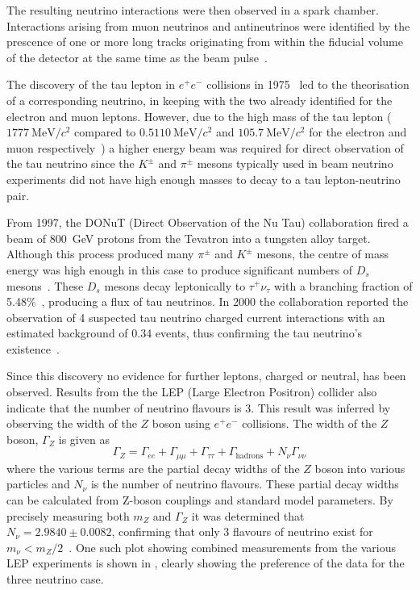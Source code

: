The resulting neutrino interactions were then observed in a spark chamber.
Interactions arising from muon neutrinos and antineutrinos were identified by the prescence of one or more long tracks originating from within the fiducial volume of the detector at the same time as the beam pulse~\cite{numuDiscovery}.   


The discovery of the tau lepton in $e^{+}e^{-}$ collisions in 1975~\cite{tauLepton} led to the theorisation of a corresponding neutrino, in keeping with the two already identified for the electron and muon leptons.
However, due to the high mass of the tau lepton ($1777~\text{MeV}/c^{2}$ compared to $0.5110~\text{MeV}/c^{2}$ and $105.7~\text{MeV}/c^{2}$ for the electron and muon respectively~\cite{pdg2018}) a higher energy beam was required for direct observation of the tau neutrino since the $K^{\pm}$ and $\pi^{\pm}$ mesons typically used in beam neutrino experiments did not have high enough masses to decay to a tau lepton-neutrino pair.

From 1997, the DONuT (Direct Observation of the Nu Tau) collaboration fired a beam of 800~GeV protons from the Tevatron into a tungsten alloy target.
Although this process produced many $\pi^{\pm}$ and $K^{\pm}$ mesons, the centre of mass energy was high enough in this case to produce significant numbers of $D_{s}$ mesons~\cite{donutFinal}.
These $D_{s}$ mesons decay leptonically to $\tau^{+}\nu_{\tau}$ with a branching fraction of 5.48\%~\cite{dsFraction}, producing a flux of tau neutrinos.
In 2000 the collaboration reported the observation of 4 suspected tau neutrino charged current interactions with an estimated background of 0.34 events, thus confirming the tau neutrino's existence~\cite{tauNeutrino}.  

Since this discovery no evidence for further leptons, charged or neutral, has been observed.
Results from the the LEP (Large Electron Positron) collider also indicate that the number of neutrino flavours is 3.
This result was inferred by observing the width of the $Z$ boson using $e^{+}e^{-}$ collisions.
The width of the $Z$ boson, $\Gamma_{Z}$ is given as
\begin{equation}
  \Gamma_{Z} = \Gamma_{ee} + \Gamma_{\mu\mu} + \Gamma_{\tau\tau} + \Gamma_{\text{hadrons}} + N_{\nu}\Gamma_{\nu\nu}
\end{equation}
where the various terms are the partial decay widths of the $Z$ boson into various particles and $N_{\nu}$ is the number of neutrino flavours.
These partial decay widths can be calculated from Z-boson couplings and standard model parameters.
By precisely measuring both $m_{Z}$ and $\Gamma_{Z}$ it was determined that $N_{\nu} = 2.9840 \pm 0.0082$, confirming that only 3 flavours of neutrino exist for $m_{\nu} < m_{Z}/2$~\cite{zBosonWidth}.
One such plot showing combined measurements from the various LEP experiments is shown in , clearly showing the preference of the data for the three neutrino case.

